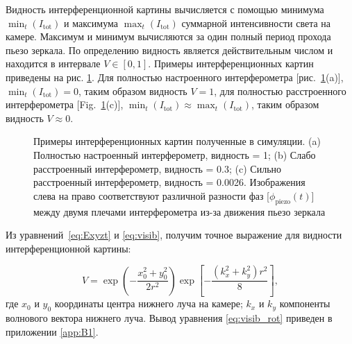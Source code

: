 Видность интерференционной картины вычисляется с помощью минимума $\min_t(I_{\mathrm{tot}})$ и максимума $\max_t(I_{\mathrm{tot}})$ суммарной интенсивности света на камере. Максимум и минимум вычисляются за один полный период прохода пьезо зеркала. По определению видность является действительным числом и находится в интервале $V \in [0, 1]$. Примеры интерференционных картин приведены на рис. \ref{fig:visib_expl}. Для полностью настроенного интерферометра [рис.~\ref{fig:visib_expl}(a)], $\min_t(I_{\mathrm{tot}})=0$, таким образом видность $V=1$, для полностью расстроенного интерферометра [Fig.~\ref{fig:visib_expl}(c)], $\min_t(I_{\mathrm{tot}})\approx\max_t(I_{\mathrm{tot}})$, таким образом видность $V\approx 0$.

\begin{figure}[ht]
\caption{Примеры интерференционных картин полученные в симуляции. (a) Полностью настроенный интерферометр, видность = 1; (b) Слабо расстроенный интерферометр, видность = 0.3; (c) Сильно расстроенный интерферометр, видность =
0.0026. Изображения слева на право соответствуют различной разности фаз [$\phi_{\mathrm{piezo}}(t)$] между двумя плечами интерферометра из-за движения пьезо зеркала}
\label{fig:visib_expl}
\end{figure}


Из уравнений~\eqref{eq:Exyzt} и \eqref{eq:visib}, получим точное выражение для видности интерференционной картины:

\begin{equation}
    V = \exp\left(- \frac{x_0^2 + y_0^2}{2 r^2}\right)  \exp\left[- \frac{(k_x^2 + k_y^2) r^2}{8}\right],
    \label{eq:visib_rot}
\end{equation}
где $x_0$ и $y_0$ координаты центра нижнего луча на камере; $k_x$ и $k_y$ компоненты волнового вектора нижнего луча. Вывод уравнения \eqref{eq:visib_rot} приведен в приложении \ref{app:B1}.

